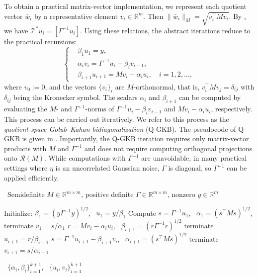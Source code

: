 \documentclass[]{myarticle}
\begin{document}
To obtain a practical matrix-vector implementation, we represent each quotient vector $\bar{w}_i$ by a representative element $v_i\in\mathbb R^m$. Then $\|\bar{w}_i\|_M=\sqrt{v_i^\top M v_i}$. By , we have $\mathcal T^\ast u_i=[\Gamma^{-1}u_i]$. Using these relations, the abstract iterations reduce to the practical recursions:
\begin{equation}\label{eq:practical-gGKB}
\left\{
\begin{aligned}
& \beta_1 u_1 = y,\\
& \alpha_i v_i = \Gamma^{-1}u_i-\beta_i v_{i-1},\\
& \beta_{i+1} u_{i+1} = M v_i-\alpha_i u_i, \quad i=1, 2, \dots,
\end{aligned}
\right.
\end{equation}
where $v_0:=0$, and the vectors $\{v_i\}_i$ are $M$-orthonormal, that is, $v_{i}^{\top}Mv_j=\delta_{ij}$ with $\delta_{ij}$ being the Kronecker symbol. The scalars $\alpha_i$ and $\beta_{i+1}$ can be computed by evaluating the $M$- and $\Gamma^{-1}$-norms of $\Gamma^{-1}u_i-\beta_i v_{i-1}$ and $M v_i-\alpha_i u_i$, respectively. This process can be carried out iteratively. We refer to this process as the \emph{quotient-space Golub--Kahan bidiagonalization} (Q-GKB). The pseudocode of Q-GKB is given in . Importantly, the Q-GKB iteration requires only matrix-vector products with $M$ and $\Gamma^{-1}$ and does not require computing orthogonal projections onto $\mathcal R(M)$. While computations with $\Gamma^{-1}$ are unavoidable, in many practical settings where $\eta$ is an uncorrelated Gaussian noise, $\Gamma$ is diagonal, so $\Gamma^{-1}$ can be applied efficiently.

\begin{algorithm}[htbp]
\caption{Quotient-space Golub--Kahan bidiagonalization (Q-GKB)}
\label{alg:qgkb}
\algorithmicrequire \ Semidefinite $M\in\mathbb{R}^{m\times m}$, positive definite $\Gamma\in\mathbb{R}^{m\times m}$, nonzero $y\in\mathbb{R}^{m}$
\begin{algorithmic}[1]
\State Initialize: $\beta_1 = (y\Gamma^{-1}y)^{1/2}$, \ $u_1 = y/\beta_1$
\State Compute $s=\Gamma^{-1}u_1$, \ $\alpha_1=(s^{\top}Ms)^{1/2}$, 
 terminate 
\Else 
\State $v_1=s/\alpha_1$ \EndIf
{}
\State $r = Mv_i-\alpha_iu_i$, \ $\beta_{i+1}=(r\Gamma^{-1}r)^{1/2}$
 terminate
\Else 
\State $u_{i+1}=r/\beta_{i+1}$
\EndIf
\State $s=\Gamma^{-1}u_{i+1}-\beta_{i+1}v_i$, \ $\alpha_{i+1}=(s^{\top}Ms)^{1/2}$
 terminate
\Else 
\State $v_{i+1}=s/\alpha_{i+1}$
\EndIf
\EndFor
\end{algorithmic}
\algorithmicensure \ $\{\alpha_i, \beta_i\}_{i=1}^{k+1}$, \ $\{u_i, v_i\}_{i=1}^{k+1}$
\end{algorithm}
\end{document}
